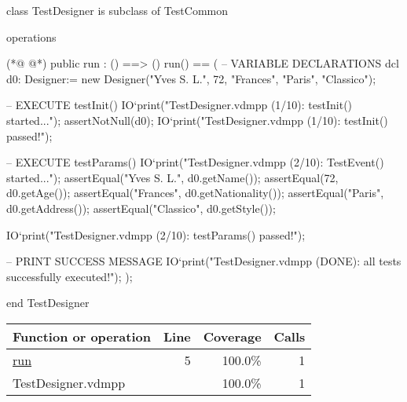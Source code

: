 \begin{vdmpp}[breaklines=true]
class TestDesigner is subclass of TestCommon

operations

(*@
\label{run:5}
@*)
  public run : () ==> ()
  run() ==
  (
    -- VARIABLE DECLARATIONS
    dcl d0: Designer:= new Designer("Yves S. L.", 72, "Frances", "Paris", "Classico");
    
    -- EXECUTE testInit()
    IO`print("TestDesigner.vdmpp (1/10): testInit() started...\n");
    assertNotNull(d0);
    IO`print("TestDesigner.vdmpp (1/10): testInit() passed!\n");

   -- EXECUTE testParams()
    IO`print("TestDesigner.vdmpp (2/10): TestEvent() started...\n");
    assertEqual("Yves S. L.", d0.getName());
    assertEqual(72, d0.getAge());    
    assertEqual("Frances", d0.getNationality()); 
    assertEqual("Paris", d0.getAddress()); 
    assertEqual("Classico", d0.getStyle()); 
    
    IO`print("TestDesigner.vdmpp (2/10): testParams() passed!\n");
      
    -- PRINT SUCCESS MESSAGE
    IO`print("TestDesigner.vdmpp (DONE): all tests successfully executed!\n");
  );

end TestDesigner
\end{vdmpp}
\bigskip
\begin{longtable}{|l|r|r|r|}
\hline
Function or operation & Line & Coverage & Calls \\
\hline
\hline
\hyperref[run:5]{run} & 5&100.0\% & 1 \\
\hline
\hline
TestDesigner.vdmpp & & 100.0\% & 1 \\
\hline
\end{longtable}

